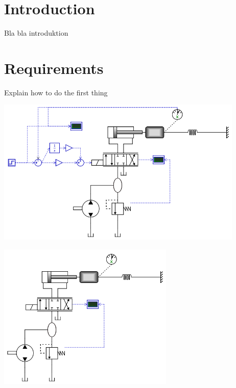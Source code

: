 \documentclass[a4paper]{article}
\begin{document}

\section*{Introduction}
Bla bla introduktion

\section*{Requirements}

\begin{enumerate}
Explain how to do the first thing

 
\includegraphics[height=7cm]{gfx/simulink/model1.png}
 

\includegraphics[height=7cm]{gfx/simulink/model2.png}


\end{enumerate}
\end{document}
